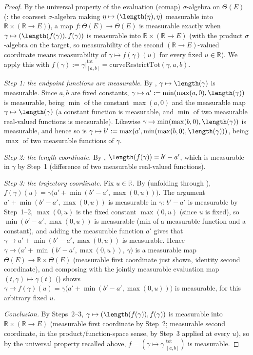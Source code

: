 \begin{proof}
  By the universal property of the evaluation (comap) $\sigma$-algebra on $\Theta(E)$
  (: the coarsest $\sigma$-algebra making $\eta \mapsto
  (\length(\eta),\eta)$ measurable into $\mathbb{R}\times(\mathbb{R}\to E)$), a map $f \colon
  \Theta(E) \to \Theta(E)$ is measurable exactly when $\gamma \mapsto (\length(f(\gamma)),
  f(\gamma))$ is measurable into $\mathbb{R}\times(\mathbb{R}\to E)$ (with the product
  $\sigma$-algebra on the target, so measurability of the second $(\mathbb{R}\to E)$-valued
  coordinate means measurability of $\gamma \mapsto f(\gamma)(u)$ for every fixed $u \in
  \mathbb{R}$). We apply this with $f(\gamma) := \gamma|^{\mathrm{tot}}_{[a,b]} =
  \mathrm{curveRestrictTot}(\gamma,a,b)$.

  \emph{Step 1: the endpoint functions are measurable.} By , $\gamma
  \mapsto \length(\gamma)$ is measurable. Since $a,b$ are fixed constants, $\gamma \mapsto a' :=
  \min(\max(a,0),\length(\gamma))$ is measurable, being $\min$ of the constant $\max(a,0)$ and the
  measurable map $\gamma\mapsto\length(\gamma)$ (a constant function is measurable, and $\min$ of
  two measurable real-valued functions is measurable). Likewise $\gamma \mapsto \min(\max(b,0),
  \length(\gamma))$ is measurable, and hence so is $\gamma \mapsto b' := \max(a', \min(\max(b,0),
  \length(\gamma)))$, being $\max$ of two measurable functions of $\gamma$.

  \emph{Step 2: the length coordinate.} By , $\length(f(\gamma)) = b' -
  a'$, which is measurable in $\gamma$ by Step~1 (difference of two measurable real-valued
  functions).

  \emph{Step 3: the trajectory coordinate.} Fix $u \in \mathbb{R}$. By 
  (unfolding through ), $f(\gamma)(u) = \gamma\bigl(a' + \min(b'-a',
  \max(0,u))\bigr)$. The argument $a' + \min(b'-a',\max(0,u))$ is measurable in $\gamma$: $b'-a'$ is
  measurable by Step~1--2, $\max(0,u)$ is the fixed constant $\max(0,u)$ (since $u$ is fixed), so
  $\min(b'-a',\max(0,u))$ is measurable (min of a measurable function and a constant), and adding
  the measurable function $a'$ gives that $\gamma \mapsto a' + \min(b'-a',\max(0,u))$ is measurable.
  Hence $\gamma \mapsto \bigl(a' + \min(b'-a',\max(0,u)),\, \gamma\bigr)$ is a measurable map
  $\Theta(E) \to \mathbb{R}\times\Theta(E)$ (measurable first coordinate just shown, identity second
  coordinate), and composing with the jointly measurable evaluation map $(t,\gamma)\mapsto\gamma(t)$
  () shows $\gamma \mapsto f(\gamma)(u) = \gamma\bigl(a' +
  \min(b'-a',\max(0,u))\bigr)$ is measurable, for this arbitrary fixed $u$.

  \emph{Conclusion.} By Steps~2--3, $\gamma \mapsto (\length(f(\gamma)), f(\gamma))$ is measurable
  into $\mathbb{R}\times(\mathbb{R}\to E)$ (measurable first coordinate by Step~2; measurable second
  coordinate, in the product/function-space sense, by Step~3 applied at every $u$), so by the
  universal property recalled above, $f = (\gamma \mapsto \gamma|^{\mathrm{tot}}_{[a,b]})$ is
  measurable.
\end{proof}
